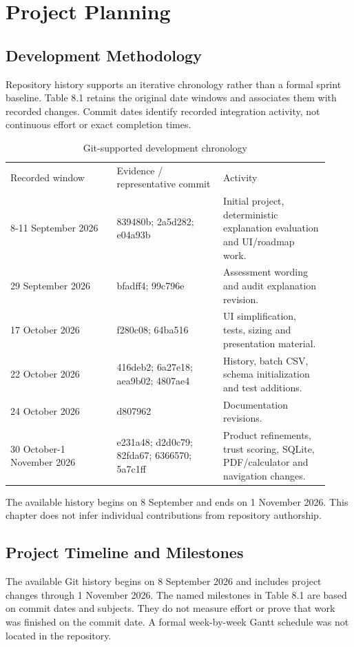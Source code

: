 \documentclass[12pt,a4paper]{report}
\begin{document}
\chapter{Project Planning}
\section{Development Methodology}
Repository history supports an iterative chronology rather than a formal sprint baseline. Table 8.1 retains the original date windows and associates them with recorded changes. Commit dates identify recorded integration activity, not continuous effort or exact completion times.

\begin{longtable}{p{0.307\linewidth}p{0.307\linewidth}p{0.307\linewidth}}
\caption{Git-supported development chronology}\\

Recorded window & Evidence / representative commit & Activity\\
8-11 September 2026 & 839480b; 2a5d282; e04a93b & Initial project, deterministic explanation evaluation and UI/roadmap work.\\
29 September 2026 & bfadff4; 99c796e & Assessment wording and audit explanation revision.\\
17 October 2026 & f280c08; 64ba516 & UI simplification, tests, sizing and presentation material.\\
22 October 2026 & 416deb2; 6a27e18; aea9b02; 4807ae4 & History, batch CSV, schema initialization and test additions.\\
24 October 2026 & d807962 & Documentation revisions.\\
30 October-1 November 2026 & e231a48; d2d0c79; 82fda67; 6366570; 5a7c1ff & Product refinements, trust scoring, SQLite, PDF/calculator and navigation changes.\\
\end{longtable}
The available history begins on 8 September and ends on 1 November 2026. This chapter does not infer individual contributions from repository authorship.

\section{Project Timeline and Milestones}
The available Git history begins on 8 September 2026 and includes project changes through 1 November 2026. The named milestones in Table 8.1 are based on commit dates and subjects. They do not measure effort or prove that work was finished on the commit date. A formal week-by-week Gantt schedule was not located in the repository.
\end{document}
